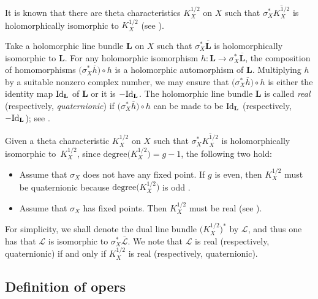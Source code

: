 \documentclass[10pt,a4paper]{amsart}
\numberwithin{equation}{section}
\begin{document}
It is known that there are theta characteristics $K^{1/2}_X$ on $X$ such that $\sigma^*_X
\overline{K^{1/2}_X}$ is holomorphically isomorphic to $K^{1/2}_X$ (see \cite[p.~61, Remark
2]{At2}).

Take a holomorphic line bundle $\mathbf L$ on $X$ such that $\sigma^*_X \overline{\mathbf
L}$ is holomorphically isomorphic to $\mathbf L$. For any holomorphic isomorphism $h\colon
{\mathbf L} \longrightarrow \sigma^*_X \overline{\mathbf L}$, the composition of
homomorphisms $\bigl(\sigma^*_X \overline{h}\bigr)\circ h$ is a holomorphic automorphism of ${\mathbf
L}$. Multiplying $h$ by a suitable nonzero complex number, we may ensure that $\bigl(\sigma^*_X
\overline{h}\bigr)\circ h$ is either the identity map ${\rm Id}_{\mathbf L}$ of $\mathbf L$ or
it is $-{\rm Id}_{\mathbf L}$. The holomorphic line bundle $\mathbf L$ is called {\it real}
(respectively, \textit{quaternionic}) if $\bigl(\sigma^*_X \overline{h}\bigr)\circ h$ can be made to
be ${\rm Id}_{\mathbf L}$ (respectively, $-{\rm Id}_{\mathbf L}$); see \cite[p.~206,
Definition 3.3]{BHH}.

Given a theta characteristic $K^{1/2}_X$ on $X$ such that $\sigma^*_X \overline{K^{1/2}_X}$
is holomorphically isomorphic to~$K^{1/2}_X$, since $\text{degree}\bigl(K^{1/2}_X\bigr) = g-1$, the following two hold:
\begin{itemize}\itemsep=0pt
\item[(1)] Assume that $\sigma_X$ does not have any fixed point. If $g$ is even, then $K^{1/2}_X$ must be quaternionic
because $\text{degree}\bigl(K^{1/2}_X\bigr)$ is odd \cite[p.~210, Proposition 4.2]{BHH}.

\item[(2)] Assume that $\sigma_X$ has fixed points. Then $K^{1/2}_X$ must be real (see \cite[p.~210, Section 4.2]{BHH}).
\end{itemize}

\begin{Definition}\label{dtc}
For simplicity, we shall denote the dual line bundle $\bigl(K^{1/2}_X\bigr)^*$ by $\mathcal L$, and thus one has that $\mathcal L$ is
isomorphic to $\sigma^*_X \overline{\mathcal L}$. We note that $\mathcal L$ is real
(respectively, quaternionic) if and only if $K^{1/2}_X$ is real (respectively,
quaternionic).
\end{Definition}

\subsection{Definition of opers}
\end{document}
